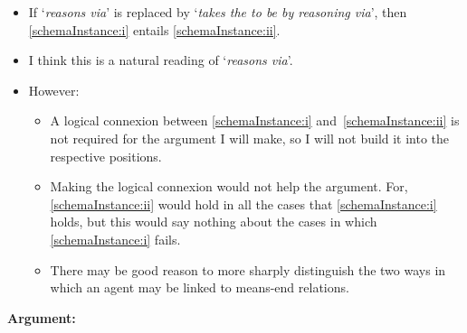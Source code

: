 \documentclass[10pt]{article}
\newcommand{\hozlinedash}[0]{%
  \noindent\hdashrule[0.5ex][c]{\textwidth}{.1pt}{2.5pt}
}
\begin{document}
\hozlinedash





\begin{itemize}
\item If `\emph{reasons via}' is replaced by `\emph{takes the to be by reasoning via}', then \ref{schemaInstance:i} entails \ref{schemaInstance:ii}.
\item I think this is a natural reading of `\emph{reasons via}'.
\item However:
  \begin{itemize}
  \item A logical connexion between \ref{schemaInstance:i} and~\ref{schemaInstance:ii} is not required for the argument I will make, so I will not build it into the respective positions.
  \item Making the logical connexion would not help the argument. For, \ref{schemaInstance:ii} would hold in all the cases that \ref{schemaInstance:i} holds, but this would say nothing about the cases in which \ref{schemaInstance:i} fails.
  \item There may be good reason to more sharply distinguish the two ways in which an agent may be linked to means-end relations.
  \end{itemize}
\end{itemize}



\newpage

\noindent\textbf{Argument:}
\end{document}
